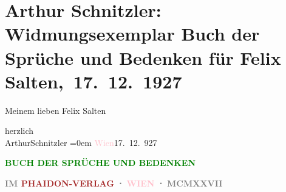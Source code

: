 

\renewcommand{\erwaehntePersonen}{Personen: Felix Salten}
\renewcommand{\erwaehnteInstitutionen}{Institutionen: Phaidon-Verlag}
\renewcommand{\erwaehnteOrte}{Orte: Wien}
\renewcommand{\erwaehnteWerke}{Werke: Buch der Sprüche und Bedenken}
\section[ Arthur Schnitzler: Widmungsexemplar Buch der Sprüche und Bedenken für Felix Salten, 17. 12. 1927]{Arthur Schnitzler: Widmungsexemplar Buch der Sprüche und Bedenken für
               Felix Salten, 17. 12. 1927}
\nopagebreak{}
\rehead{ }\normalsize\beginnumbering{}
\toendnotes[C]{\smallbreak\pagebreak[2]}
\pstart
           \noindent{}{\pb}Meinem lieben Felix Salten\pend
           
\pstart
           herzlich {\\[\baselineskip]}\spacefill\mbox{ArthurSchnitzler}\pend
           \leftskip=0em{}
\pstart
           \textcolor{pink}{Wien}{}\ledrightnote{\textcolor{pink}{Wien}}{ }17. 12. 927\pend
           {\bigskip}
\pstart
           \noindent{}\centering{}{\pb}\textcolor{gray}{\textbf{}}\pend
           
\pstart
           \noindent{}\centering{}\textcolor{gray}{\textbf{\textcolor{green}{BUCH DER SPRÜCHE UND BEDENKEN}{}\ledrightnote{\textcolor{green}{Buch der Sprüche und Bedenken}}}}\pend
           
\pstart
           \noindent{}\centering{}\textcolor{gray}{\textbf{}}\pend
           {\bigskip}
\pstart
           \noindent{}\centering{}\textcolor{gray}{\textbf{IM \textcolor{brown}{PHAIDON-VERLAG}{}\ledrightnote{\textcolor{brown}{Phaidon-Verlag}} ⋅ \textcolor{pink}{WIEN}{}\ledrightnote{\textcolor{pink}{Wien}} ⋅ MCMXXVII}}\pend
           \endnumbering{}  
      